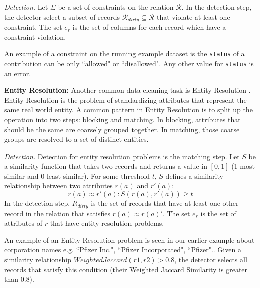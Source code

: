 \emph{Detection. } Let $\Sigma$ be a set of constraints on the relation $\mathcal{R}$. 
In the detection step, the detector select a subset of records $\mathcal{R}_{dirty} \subseteq \mathcal{R}$ that violate at least one constraint.
The set $e_r$ is the set of columns for each record which have a constraint violation. 

\begin{example}
An example of a constraint on the running example dataset is the \texttt{status} of
a contribution can be only ``allowed" or ``disallowed".
Any other value for \texttt{status} is an error.
\end{example}

\vspace{0.5em}

\noindent\textbf{Entity Resolution: }
Another common data cleaning task is Entity Resolution \cite{gokhale2014corleone, DBLP:journals/pvldb/KopckeTR10, wang2012crowder}.
Entity Resolution is the problem of standardizing attributes that represent the same real world entity.
A common pattern in Entity Resolution is to split up the operation into two steps: blocking and matching.
In blocking, attributes that should be the same are coarsely grouped together.
In matching, those coarse groups are resolved to a set of distinct entities.

\vspace{0.5em}

\emph{Detection. } Detection for entity resolution problems is the matching step. Let $S$ be a similarity function that takes two records and returns a value in $[0,1]$ (1 most similar and 0 least similar). For some threshold $t$, $S$ defines a similarity relationship between two attributes $r(a)$ and $r'(a)$:
\[
r(a) \approx r'(a) : S(r(a),r'(a)) \ge t
\] 
In the detection step, $R_{dirty}$ is the set of records that have at least one other record in the relation that satisfies $r(a) \approx r(a)'$.
The set $e_r$ is the set of attributes of $r$ that have entity resolution problems.

\begin{example}
An example of an Entity Resolution problem is seen in our earlier example about corporation names e.g. ``Pfizer Inc.", ``Pfizer Incorporated", ``Pfizer".. 
Given a similarity relationship $WeightedJaccard(r1,r2)>0.8$, the detector selects all records that satisfy this condition (their Weighted Jaccard Similarity is greater than 0.8).
\end{example}

